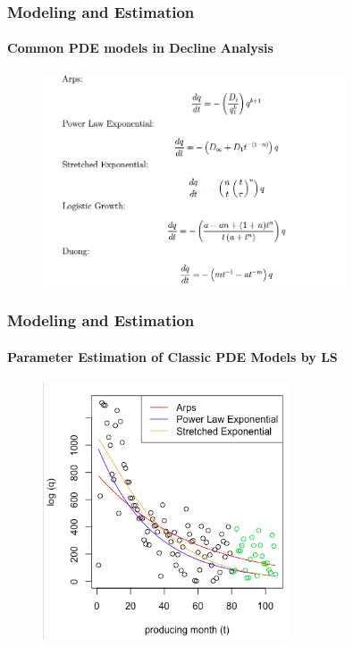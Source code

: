 \documentclass[11pt]{beamer}
\begin{document}
		
\begin{frame}
	\frametitle{Modeling and Estimation}
	\framesubtitle{Common PDE models in Decline Analysis}
	\justifying
	\begin{figure}
		\begin{center}
			\includegraphics[width=0.8\textwidth  ]{model} 
		\end{center}
	\end{figure}
\end{frame}		
		
				
\begin{frame}
	\frametitle{Modeling and Estimation}
	\framesubtitle{Parameter Estimation of Classic PDE Models by LS}
	\begin{figure}
		\begin{center}
			\includegraphics[width=0.65\textwidth  ]{arps} 
			
		\end{center}
	\end{figure}	
\end{frame}		
		
\end{document}
